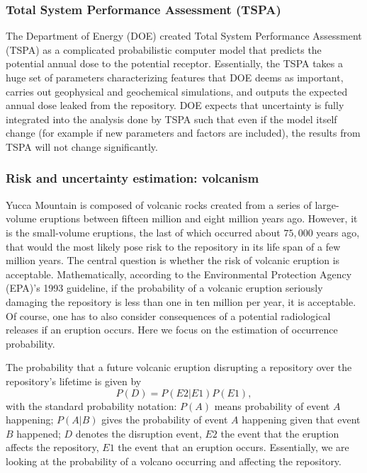 \documentclass[nofootinbib,preprint,aps]{revtex4-1}
\begin{document}
        \subsubsection{Total System Performance Assessment (TSPA)}
        The Department of Energy (DOE) created Total System Performance Assessment (TSPA) as a complicated
        probabilistic
        computer model that predicts the potential annual dose to the potential receptor.
        Essentially, the TSPA takes a huge set of parameters characterizing features that DOE deems as important,
        carries out geophysical and geochemical simulations,
        and outputs the expected annual dose leaked from the repository.
        DOE expects that
        uncertainty is fully integrated into the analysis done by TSPA such that even if the model itself change
        (for example if new parameters and factors are included), the results from TSPA will not change
        significantly.\cite{cv14,ocrwm02} 

        \subsubsection{Risk and uncertainty estimation: volcanism}
        \label{sec:volcano}
        Yucca Mountain is composed of volcanic rocks created from a series of large-volume eruptions between
        fifteen million and eight million years ago. However, it is the small-volume eruptions, the last of
        which occurred about $75,000$ years ago, that would the most likely pose risk to the repository
        in its life span of a few million years.
        The central question is whether the risk of volcanic eruption is acceptable. Mathematically,
        according to the Environmental Protection Agency (EPA)'s 1993 guideline,
        if the probability of a volcanic eruption seriously damaging the repository is less than
        one in ten million per year, it is acceptable.\cite{epa93}
        Of course, one has to also consider consequences of a potential radiological releases if an eruption
        occurs. Here we focus on the estimation of occurrence probability.

        The probability that a future volcanic eruption disrupting a repository over
        the repository's lifetime is given by
        \begin{equation}
            \label{eq:prob}
            P(D) = P(E2|E1)P(E1),
        \end{equation}
        with the standard probability notation: 
        $P(A)$ means probability of event $A$ happening;
        $P(A|B)$ gives the probability of event $A$ happening given that event $B$ happened;
        $D$ denotes the disruption event,
        $E2$ the event that the eruption affects the repository, $E1$ the event that an eruption occurs.
        Essentially, we are looking at the probability of a volcano occurring and affecting the repository.
\end{document}
